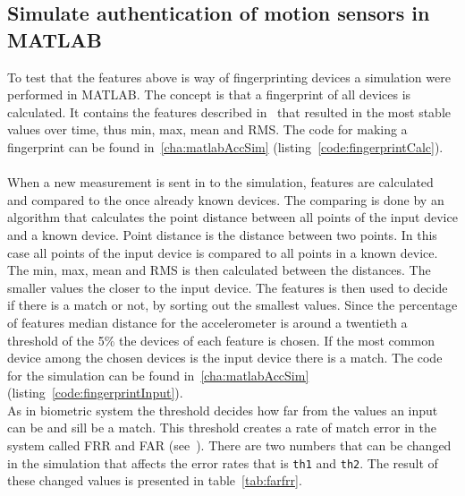 \subsection{Simulate authentication of motion sensors in MATLAB}
To test that the features above is way of fingerprinting devices a simulation were performed in MATLAB. The concept is that a fingerprint of all devices is calculated. It contains the features described in~ that resulted in the most stable values over time, thus min, max, mean and RMS. The code for making a fingerprint can be found in~\ref{cha:matlabAccSim} (listing~\ref{code:fingerprintCalc}).\\
\\
When a new measurement is sent in to the simulation, features are calculated and compared to the once already known devices. The comparing is done by an algorithm that calculates the point distance between all points of the input device and a known device. Point distance is the distance between two points. In this case all points of the input device is compared to all points in a known device. \\
The min, max, mean and RMS is then calculated between the distances. The smaller values the closer to the input device. 
The features is then used to decide if there is a match or not, by sorting out the smallest values. Since the percentage of features median distance for the accelerometer is around a twentieth a threshold of the 5\% the devices of each feature is chosen. If the most common device among the chosen devices is the input device there is a match. The code for the simulation can be found in~\ref{cha:matlabAccSim} (listing~\ref{code:fingerprintInput}).\\
As in biometric system the threshold decides how far from the values an input can be and sill be a match. This threshold creates a rate of match error in the system called FRR and FAR (see~). There are two numbers that can be changed in the simulation that affects the error rates that is \texttt{th1} and \texttt{th2}. The result of these changed values is presented in table~\ref{tab:farfrr}.

